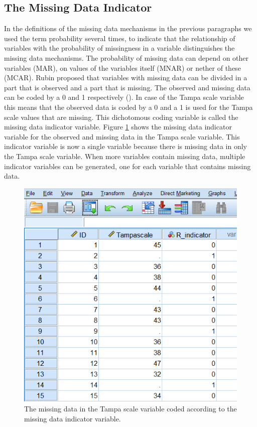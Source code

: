 \documentclass[]{book}
\begin{document}
\subsection{The Missing Data
Indicator}\label{the-missing-data-indicator}

In the definitions of the missing data mechanisms in the previous
paragraphs we used the term probability several times, to indicate that
the relationship of variables with the probability of missingness in a
variable distinguishes the missing data mechanisms. The probability of
missing data can depend on other variables (MAR), on values of the
variables itself (MNAR) or nether of these (MCAR). Rubin proposed that
variables with missing data can be divided in a part that is observed
and a part that is missing. The observed and missing data can be coded
by a 0 and 1 respectively (\citet{Rubin1987}). In case of the Tampa
scale variable this means that the observed data is coded by a 0 and a 1
is used for the Tampa scale values that are missing. This dichotomous
coding variable is called the missing data indicator variable. Figure
\ref{fig:fig2-8} shows the missing data indicator variable for the
observed and missing data in the Tampa scale variable. This indicator
variable is now a single variable because there is missing data in only
the Tampa scale variable. When more variables contain missing data,
multiple indicator variables can be generated, one for each variable
that contains missing data.

\begin{figure}

{\centering \includegraphics[width=0.9\linewidth]{images/fig2.8} 

}

\caption{The missing data in the Tampa scale variable coded according to the missing data indicator variable.}\label{fig:fig2-8}
\end{figure}
\end{document}
